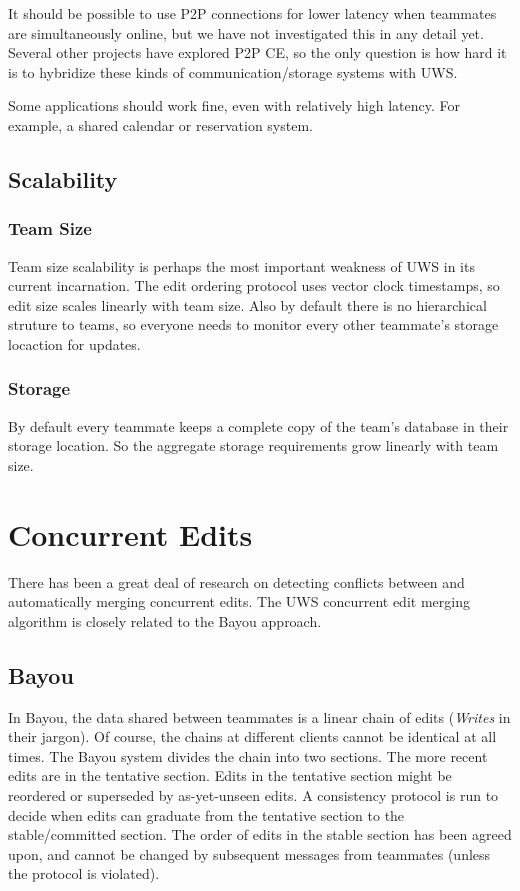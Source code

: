 \documentclass{article}
\begin{document}
It should be possible to use P2P connections for lower latency when teammates are simultaneously online, but we have not investigated this in any detail yet.
Several other projects have explored P2P CE, so the only question is how hard it is to hybridize these kinds of communication/storage systems with UWS.

Some applications should work fine, even with relatively high latency.
For example, a shared calendar or reservation system.

\subsection{Scalability}

\subsubsection{Team Size}

Team size scalability is perhaps the most important weakness of UWS in its current incarnation.
The edit ordering protocol uses vector clock timestamps, so edit size scales linearly with team size.
Also by default there is no hierarchical struture to teams, so everyone needs to monitor every other teammate's storage locaction for updates.

\subsubsection{Storage}

By default every teammate keeps a complete copy of the team's database in their storage location.
So the aggregate storage requirements grow linearly with team size.


\section{Concurrent Edits}

There has been a great deal of research on detecting conflicts between and automatically merging concurrent edits.
The UWS concurrent edit merging algorithm is closely related to the Bayou approach.

\subsection{Bayou}

In Bayou, the data shared between teammates is a linear chain of edits (\emph{Writes} in their jargon).
Of course, the chains at different clients cannot be identical at all times.
The Bayou system divides the chain into two sections.
The more recent edits are in the tentative section.
Edits in the tentative section might be reordered or superseded by as-yet-unseen edits.
A consistency protocol is run to decide when edits can graduate from the tentative section to the stable/committed section.
The order of edits in the stable section has been agreed upon, and cannot be changed by subsequent messages from teammates (unless the protocol is violated).
\end{document}
